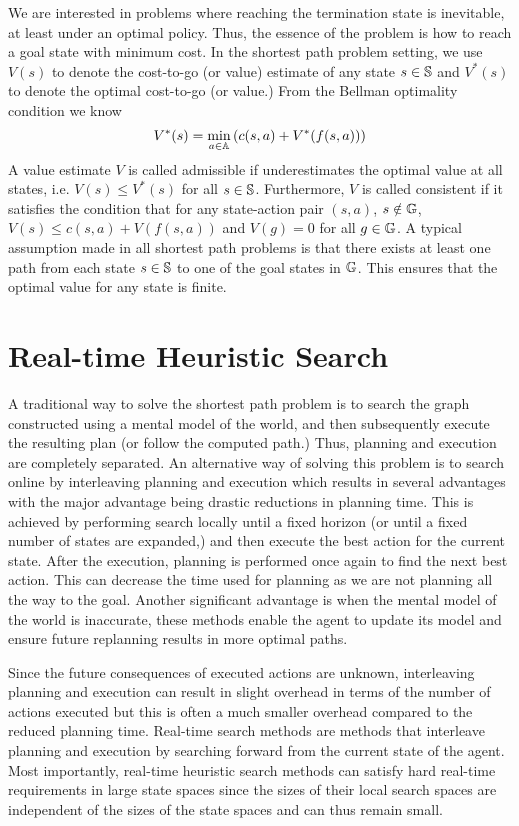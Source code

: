 We are interested in problems where reaching the termination state is
inevitable, at least under an optimal policy. Thus, the essence of the
problem is how to reach a goal state with minimum cost. In the
shortest path problem setting, we use $V(s)$ to denote the cost-to-go
(or value) estimate of any state $s \in \mathbb{S}$ and $V^*(s)$ to
denote the optimal cost-to-go (or value.) From the Bellman optimality
condition we know
\begin{equation}
  \label{eq:9}
  V^*(s) = \min_{a \in \mathbb{A}}\left( c(s, a) + V^*(f(s, a)) \right)
\end{equation}
A value estimate $V$ is called admissible if underestimates the
optimal value at all states, i.e. $V(s) \leq V^*(s)$ for all $s \in
\mathbb{S}$. Furthermore, $V$ is called consistent if it satisfies
the condition that for any state-action pair $(s, a)$, $s \notin
\mathbb{G}$, $V(s) \leq c(s, a) + V(f(s, a))$ and $V(g) = 0$ for all
$g \in \mathbb{G}$.
A typical assumption made in all shortest path problems is that there
exists at least one path from each state $s \in \mathbb{S}$ to one of
the goal states in $\mathbb{G}$. This ensures that the optimal value
for any state is finite.

\section{Real-time Heuristic Search}
\label{sec:real-time-heuristic-1}

A traditional way to solve the shortest path problem is to search the
graph constructed using a mental model of the world, and then
subsequently execute the resulting plan (or follow the computed path.)
Thus, planning and execution are completely separated. An alternative
way of solving this problem is to search online by interleaving
planning and execution which results in several advantages with the
major advantage being drastic reductions in planning time. This is
achieved by performing search locally until a fixed horizon (or until
a fixed number of states are expanded,) and then execute the best
action for the current state. After the execution, planning is
performed once again to find the next best action. This can decrease
the time used for planning as we are not planning all the way to the
goal. Another significant advantage is when the mental model of the
world is inaccurate, these methods enable the agent to update its
model and ensure future replanning results in more optimal paths.

Since the future consequences of executed actions are unknown,
interleaving planning and execution can result in slight overhead in
terms of the number of actions executed but this is often a much
smaller overhead compared to the reduced planning time. Real-time
search methods are methods that interleave planning and execution by
searching forward from the current state of the agent. Most
importantly, real-time heuristic search methods can satisfy hard
real-time requirements in large state spaces since the sizes of their
local search spaces are independent of the sizes
of the state spaces and can thus remain small.

